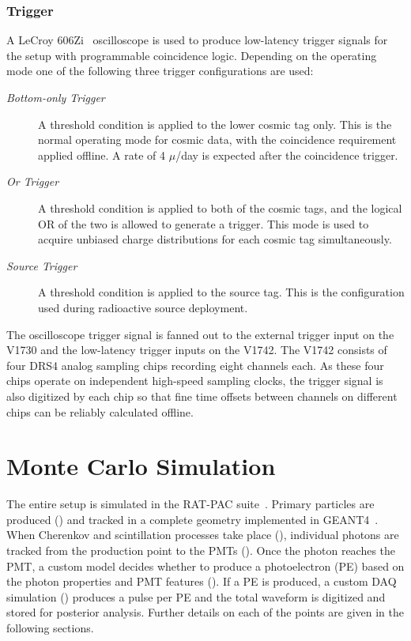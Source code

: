 \subsubsection{Trigger}
\label{sec:triggering}

A LeCroy 606Zi~\cite{lecroy606zi} oscilloscope is used to produce low-latency trigger signals for the setup with programmable coincidence logic. 
Depending on the operating mode one of the following three trigger configurations are used:
\begin{description}
\item [\rm\it Bottom-only Trigger] A threshold condition is applied to the lower cosmic tag only. 
This is the normal operating mode for cosmic data, with the coincidence requirement applied offline.  
A rate of 4 $\mu$/day is expected after the coincidence trigger.
\item [\rm\it Or Trigger] A threshold condition is applied to both of the cosmic tags, and the logical OR of the two is allowed to generate a trigger. 
This mode is used to acquire unbiased charge distributions for each cosmic tag simultaneously.
\item [\rm\it Source Trigger] A threshold condition is applied to the source tag. 
This is the configuration used during radioactive source deployment.
\end{description}
The oscilloscope trigger signal is fanned out to the external trigger input on the V1730 and the low-latency trigger inputs on the V1742.
The V1742 consists of four DRS4 analog sampling chips recording eight channels each.
As these four chips operate on independent high-speed sampling clocks, the trigger signal is also digitized by each chip so that fine time offsets between channels on different chips can be reliably calculated offline.  



\section{Monte Carlo Simulation}
\label{sec:simulation}

The entire setup is simulated in the RAT-PAC suite~\cite{ratpac}. Primary particles are produced () and tracked in a complete geometry implemented in GEANT4~\cite{geant4}. When Cherenkov and scintillation processes take place (), individual photons are tracked from the production point to the PMTs (). Once the photon reaches the PMT, a custom model decides whether to produce a photoelectron (PE) based on the photon properties and PMT features (). If a PE is produced, a custom DAQ simulation () produces a pulse per PE and the total waveform is digitized and stored for posterior analysis. Further details on each of the points are given in the following sections.


